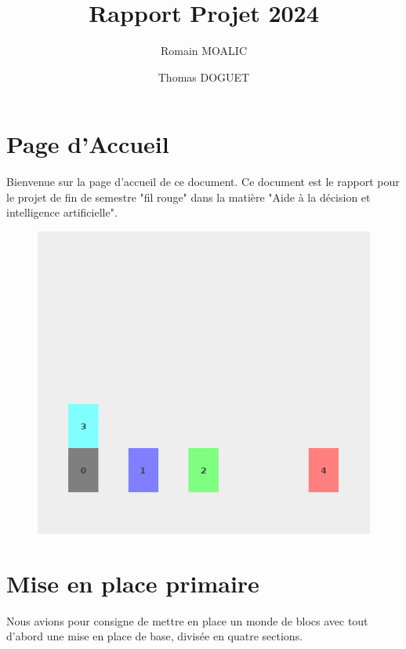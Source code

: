\documentclass[12pt]{article}
\begin{document}
    \title{Rapport Projet 2024}
    \author{Romain MOALIC \and Thomas DOGUET}
    \maketitle
    \newpage
    \tableofcontents
    \newpage

    \section{Page d'Accueil}
        Bienvenue sur la page d'accueil de ce document. Ce document est le rapport pour le projet de fin de semestre "fil rouge" dans la matière "Aide à la décision et intelligence artificielle".
		\begin{figure}[H]
			\centering
			\includegraphics[width=1\textwidth]{image/accueil.png}
		\end{figure}
    \newpage %

    \section{Mise en place primaire}
        Nous avions pour consigne de mettre en place un monde de blocs avec tout d'abord une mise en place de base, divisée en quatre sections.
        
\end{document}

